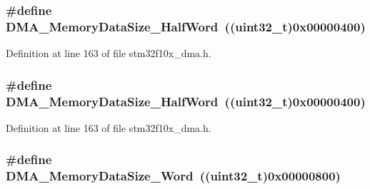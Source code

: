 \subsubsection[{\texorpdfstring{D\+M\+A\+\_\+\+Memory\+Data\+Size\+\_\+\+Half\+Word}{DMA_MemoryDataSize_HalfWord}}]{\setlength{\rightskip}{0pt plus 5cm}\#define D\+M\+A\+\_\+\+Memory\+Data\+Size\+\_\+\+Half\+Word~(({\bf uint32\+\_\+t})0x00000400)}\hypertarget{group___d_m_a__memory__data__size_ga74c9b4e547f5eaaf35d4fd3d01ed5741}{}\label{group___d_m_a__memory__data__size_ga74c9b4e547f5eaaf35d4fd3d01ed5741}


Definition at line 163 of file stm32f10x\+\_\+dma.\+h.

\subsubsection[{\texorpdfstring{D\+M\+A\+\_\+\+Memory\+Data\+Size\+\_\+\+Half\+Word}{DMA_MemoryDataSize_HalfWord}}]{\setlength{\rightskip}{0pt plus 5cm}\#define D\+M\+A\+\_\+\+Memory\+Data\+Size\+\_\+\+Half\+Word~(({\bf uint32\+\_\+t})0x00000400)}\hypertarget{group___d_m_a__memory__data__size_ga74c9b4e547f5eaaf35d4fd3d01ed5741}{}\label{group___d_m_a__memory__data__size_ga74c9b4e547f5eaaf35d4fd3d01ed5741}


Definition at line 163 of file stm32f10x\+\_\+dma.\+h.

\subsubsection[{\texorpdfstring{D\+M\+A\+\_\+\+Memory\+Data\+Size\+\_\+\+Word}{DMA_MemoryDataSize_Word}}]{\setlength{\rightskip}{0pt plus 5cm}\#define D\+M\+A\+\_\+\+Memory\+Data\+Size\+\_\+\+Word~(({\bf uint32\+\_\+t})0x00000800)}\hypertarget{group___d_m_a__memory__data__size_gaff403722a6f82d4b34c9ef306507bb98}{}\label{group___d_m_a__memory__data__size_gaff403722a6f82d4b34c9ef306507bb98}


